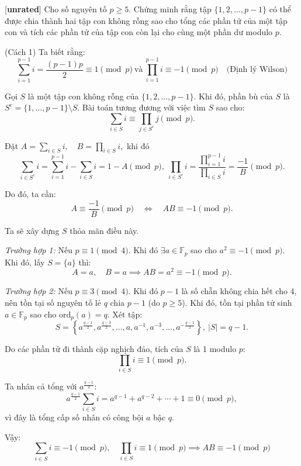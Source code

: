 \documentclass[../01-divisibility.tex]{subfiles}
\begin{document}
\begin{example*}\label{example:RUS-2015-TST-D10-P2}[\textbf{unrated}]
	Cho số nguyên tố $p \ge 5$. Chứng minh rằng tập $\{1,2,\ldots,p - 1\}$ có thể được chia thành hai tập con không rỗng
	sao cho tổng các phần tử của một tập con và tích các phần tử của tập con còn lại cho cùng một phần dư modulo $p$.	
\end{example*}

\begin{soln}(Cách 1)\footnotemark
	Ta biết rằng:
    \[
        \sum_{i=1}^{p-1} i = \frac{(p-1)p}{2} \equiv 1 \pmod{p}\ \text{và}\ \prod_{i=1}^{p-1} i \equiv -1 \pmod{p} \quad \text{(Định lý Wilson)}
    \]
    
	Gọi $S$ là một tập con không rỗng của $\{1, 2, \ldots, p-1\}$. Khi đó, phần bù của $S$ là $S^c = \{1, \ldots, p-1\} \setminus S$.
	Bài toán tương đương với việc tìm $S$ sao cho:
    \[
        \sum_{i \in S} i \equiv \prod_{j \in S^c} j \pmod{p}.
    \]
    
	Đặt $A = \sum_{i \in S} i, \quad B = \prod_{i \in S} i,$ khi đó
    \[
		\sum_{i \in S^c} i = \sum_{i=1}^{p-1} i - \sum_{i \in S} i = 1 - A \pmod{p},\
		\prod_{i \in S^c} i = \frac{\prod_{i=1}^{p-1} i}{\prod_{i \in S} i} = \frac{-1}{B} \pmod{p}.
    \]

	
	Do đó, ta cần:
    \[
        A \equiv \frac{-1}{B} \pmod{p} \quad \Longleftrightarrow \quad AB \equiv -1 \pmod{p}.
    \]

    Ta sẽ xây dựng $S$ thỏa mãn điều này.

    \textit{Trường hợp 1:} Nếu $p \equiv 1 \pmod{4}$. Khi đó $\exists a \in \mathbb{F}_p$ sao cho $a^2 \equiv -1 \pmod{p}$. Khi đó, lấy $S = \{a\}$ thì:
    \[
        A = a, \quad B = a \implies AB = a^2 \equiv -1 \pmod{p}.
    \]

    \textit{Trường hợp 2:} Nếu $p \equiv 3 \pmod{4}$. Khi đó $p-1$ là số chẵn không chia hết cho 4, nên tồn tại số nguyên tố lẻ $q$ chia $p-1$ (do $p \ge 5$).
	Khi đó, tồn tại phần tử sinh $a \in \mathbb{F}_p$ sao cho $\mathrm{ord}_p(a) = q$. Xét tập:
    \[
        S = \left\{a^{\frac{q-1}{2}}, a^{\frac{q-3}{2}}, \ldots, a, a^{-1}, a^{-3}, \ldots, a^{-\frac{q-1}{2}}\right\},\ |S| = q-1.
    \]

    Do các phần tử đi thành cặp nghịch đảo, tích của $S$ là 1 modulo $p$:
	\[
		\prod_{i \in S} i \equiv 1 \pmod{p}.
	\]

	Ta nhân cả tổng với $a^{\frac{q-1}{2}}$:
	\[
		a^{\frac{q-1}{2}} \sum_{i \in S} i = a^{q-1} + a^{q-2} + \cdots + 1 \equiv 0 \pmod{p},
	\]
	vì đây là tổng cấp số nhân có công bội $a$ bậc $q$.

    Vậy:
    \[
        \sum_{i \in S} i \equiv -1 \pmod{p}, \quad \prod_{i \in S} i \equiv 1 \pmod{p} \implies AB \equiv -1 \pmod{p}
    \]
\end{soln}

\end{document}
